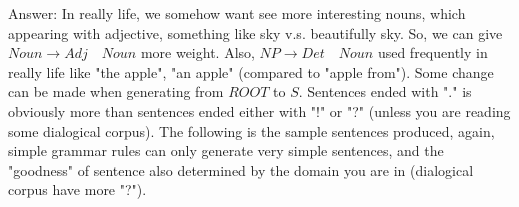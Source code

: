 \documentclass[a4paper, 11pt]{article}
\begin{document}
Answer: In really life, we somehow want see more interesting nouns, which appearing with adjective, something like sky v.s. beautifully sky. So, we can give $Noun \to Adj \quad Noun$ more weight. Also, $NP \to Det \quad Noun$ used frequently in really life like "the apple", "an apple" (compared to "apple from"). Some change can be made when generating from $ROOT$ to $S$. Sentences ended with "." is obviously more than sentences ended either with "!" or "?" (unless you are reading some dialogical corpus). The following is the sample sentences produced, again, simple grammar rules can only generate very simple sentences, and the "goodness" of sentence also determined by the domain you are in (dialogical corpus have more "?"). \\
\\


\end{document}
